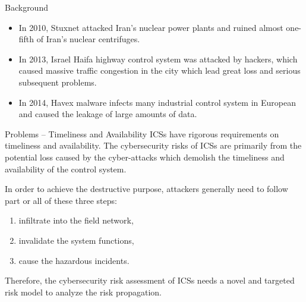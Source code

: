 \begin{frame}{Background}
    \begin{itemize}
      \item In 2010, Stuxnet attacked Iran's nuclear power plants and ruined almost one-fifth of Iran's nuclear centrifuges.
      \item In 2013, Israel Haifa highway control system  was attacked by hackers, which caused massive traffic congestion in the city which lead great loss and serious subsequent problems.
      \item In 2014, Havex malware infects many industrial control system in European  and caused the leakage of large amounts of data.
    \end{itemize}

    \begin{minipage}[c][][t]{0.6\textwidth}
      
    \end{minipage}
    \begin{minipage}[c][][t]{0.35\textwidth}
    \end{minipage}
\end{frame}

\begin{frame}{Problems -- Timeliness and Availability}
    ICSs have rigorous requirements on timeliness and availability. The cybersecurity risks of ICSs are primarily from the potential loss caused by the cyber-attacks which demolish the timeliness and availability of the control system.

    In order to achieve the destructive purpose, attackers generally need to follow part or all of these three steps:
    \begin{enumerate}
      \item infiltrate into the field network,
      \item invalidate the system functions,
      \item cause the hazardous incidents.
    \end{enumerate}

    Therefore, the cybersecurity risk assessment of ICSs needs  a novel and targeted risk model to analyze the risk propagation.
\end{frame}

